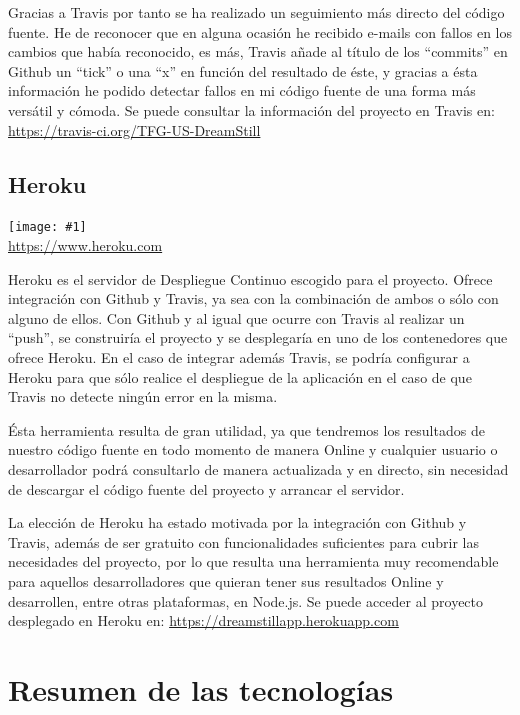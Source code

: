 \documentclass[11pt,openany]{book}
\newcommand{\logo}[2]{\medskip\begin{center}\texttt{[image: \#1]}\\\scriptsize\url{#2}\end{center}\bigskip}
\begin{document}
Gracias a Travis por tanto se ha realizado un seguimiento más directo del código fuente. He de reconocer que en alguna ocasión he recibido e-mails con fallos en los cambios que había reconocido, es más, Travis añade al título de los ``commits'' en Github un ``tick'' o una ``x'' en función del resultado de éste, y gracias a ésta información he podido detectar fallos en mi código fuente de una forma más versátil y cómoda. Se puede consultar la información del proyecto en Travis en: \url{https://travis-ci.org/TFG-US-DreamStill}

\subsection{Heroku}

\logo{logos/heroku.jpg}{https://www.heroku.com}

Heroku es el servidor de Despliegue Continuo escogido para el proyecto. Ofrece integración con Github y Travis, ya sea con la combinación de ambos o sólo con alguno de ellos. Con Github y al igual que ocurre con Travis al realizar un ``push'', se construiría el proyecto y se desplegaría en uno de los contenedores que ofrece Heroku. En el caso de integrar además Travis, se podría configurar a Heroku para que sólo realice el despliegue de la aplicación en el caso de que Travis no detecte ningún error en la misma.

Ésta herramienta resulta de gran utilidad, ya que tendremos los resultados de nuestro código fuente en todo momento de manera Online y cualquier usuario o desarrollador podrá consultarlo de manera actualizada y en directo, sin necesidad de descargar el código fuente del proyecto y arrancar el servidor. 

La elección de Heroku ha estado motivada por la integración con Github y Travis, además de ser gratuito con funcionalidades suficientes para cubrir las necesidades del proyecto, por lo que resulta una herramienta muy recomendable para aquellos desarrolladores que quieran tener sus resultados Online y desarrollen, entre otras plataformas, en Node.js. Se puede acceder al proyecto desplegado en Heroku en: \url{https://dreamstillapp.herokuapp.com}

\section{Resumen de las tecnologías}
\end{document}
